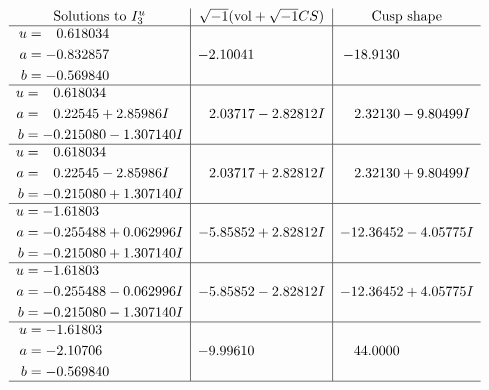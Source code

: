 \documentclass[1p]{elsarticle_modified}
\theoremstyle{definition}
\newcommand{\I}{\sqrt{-1}}
\begin{document}
$$\begin{array}{c|c|c}  
\text{Solutions to }I^u_{3}& \I (\text{vol} + \sqrt{-1}CS) & \text{Cusp shape}\\
 \hline 
\begin{aligned}
u &= \phantom{-}0.618034\phantom{ +0.000000I} \\
a &= -0.832857\phantom{ +0.000000I} \\
b &= -0.569840\phantom{ +0.000000I}\end{aligned}
 & -2.10041\phantom{ +0.000000I} & -18.9130\phantom{ +0.000000I} \\ \hline\begin{aligned}
u &= \phantom{-}0.618034\phantom{ +0.000000I} \\
a &= \phantom{-}0.22545 + 2.85986 I \\
b &= -0.215080 - 1.307140 I\end{aligned}
 & \phantom{-}2.03717 - 2.82812 I & \phantom{-}2.32130 - 9.80499 I \\ \hline\begin{aligned}
u &= \phantom{-}0.618034\phantom{ +0.000000I} \\
a &= \phantom{-}0.22545 - 2.85986 I \\
b &= -0.215080 + 1.307140 I\end{aligned}
 & \phantom{-}2.03717 + 2.82812 I & \phantom{-}2.32130 + 9.80499 I \\ \hline\begin{aligned}
u &= -1.61803\phantom{ +0.000000I} \\
a &= -0.255488 + 0.062996 I \\
b &= -0.215080 + 1.307140 I\end{aligned}
 & -5.85852 + 2.82812 I & -12.36452 - 4.05775 I \\ \hline\begin{aligned}
u &= -1.61803\phantom{ +0.000000I} \\
a &= -0.255488 - 0.062996 I \\
b &= -0.215080 - 1.307140 I\end{aligned}
 & -5.85852 - 2.82812 I & -12.36452 + 4.05775 I \\ \hline\begin{aligned}
u &= -1.61803\phantom{ +0.000000I} \\
a &= -2.10706\phantom{ +0.000000I} \\
b &= -0.569840\phantom{ +0.000000I}\end{aligned}
 & -9.99610\phantom{ +0.000000I} & \phantom{-}44.0000\phantom{ +0.000000I}\\
 \hline 
 \end{array}$$\newpage\newpage\renewcommand{\arraystretch}{1}
\end{document}
